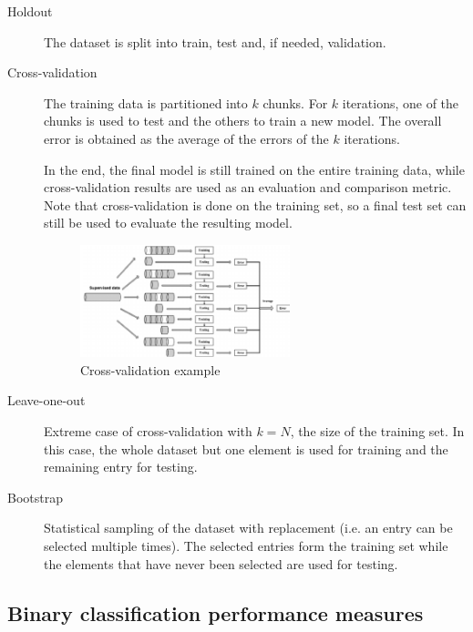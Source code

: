 \begin{description}
    \item[Holdout] 
        The dataset is split into train, test and, if needed, validation.

    \item[Cross-validation] 
        The training data is partitioned into $k$ chunks.
        For $k$ iterations, one of the chunks is used to test and the others to train a new model.
        The overall error is obtained as the average of the errors of the $k$ iterations.

        In the end, the final model is still trained on the entire training data, 
        while cross-validation results are used as an evaluation and comparison metric.
        Note that cross-validation is done on the training set, so a final test set can still be used to
        evaluate the resulting model.

        \begin{figure}[h]
            \centering
            \includegraphics[width=0.6\textwidth]{img/cross_validation.png}
            \caption{Cross-validation example}
        \end{figure}

    \item[Leave-one-out] 
        Extreme case of cross-validation with $k=N$, the size of the training set.
        In this case, the whole dataset but one element is used for training and the remaining entry for testing.

    \item[Bootstrap] 
        Statistical sampling of the dataset with replacement (i.e. an entry can be selected multiple times).
        The selected entries form the training set while the elements that have never been selected are used for testing.
\end{description}


\subsection{Binary classification performance measures}

